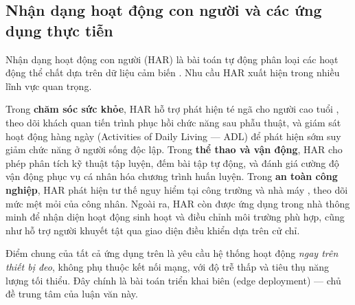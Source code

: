 \subsection{Nhận dạng hoạt động con người và các ứng dụng thực tiễn}

Nhận dạng hoạt động con người (HAR) là bài toán tự động phân loại các hoạt động thể chất dựa trên dữ liệu cảm biến \cite{lara2013survey, bulling2014tutorial}. Nhu cầu HAR xuất hiện trong nhiều lĩnh vực quan trọng.

Trong \textbf{chăm sóc sức khỏe}, HAR hỗ trợ phát hiện té ngã cho người cao tuổi \cite{wan2021deep_har_review}, theo dõi khách quan tiến trình phục hồi chức năng sau phẫu thuật, và giám sát hoạt động hàng ngày (Activities of Daily Living --- ADL) để phát hiện sớm suy giảm chức năng ở người sống độc lập. Trong \textbf{thể thao và vận động}, HAR cho phép phân tích kỹ thuật tập luyện, đếm bài tập tự động, và đánh giá cường độ vận động phục vụ cá nhân hóa chương trình huấn luyện. Trong \textbf{an toàn công nghiệp}, HAR phát hiện tư thế nguy hiểm tại công trường và nhà máy \cite{wang2023har_industrial}, theo dõi mức mệt mỏi của công nhân. Ngoài ra, HAR còn được ứng dụng trong nhà thông minh để nhận diện hoạt động sinh hoạt và điều chỉnh môi trường phù hợp, cũng như hỗ trợ người khuyết tật qua giao diện điều khiển dựa trên cử chỉ.

Điểm chung của tất cả ứng dụng trên là yêu cầu hệ thống hoạt động \textit{ngay trên thiết bị đeo}, không phụ thuộc kết nối mạng, với độ trễ thấp và tiêu thụ năng lượng tối thiểu. Đây chính là bài toán triển khai biên (edge deployment) --- chủ đề trung tâm của luận văn này.

